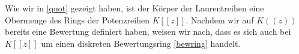 Wie wir in \ref{quot} gezeigt haben, ist der Körper der Laurentreihen eine Obermenge des Rings der Potenzreihen $K[[z]]$. Nachdem wir auf $K((z))$ bereits eine Bewertung definiert haben, weisen wir nach, dass es sich auch bei $K[[z]]$ um einen diskreten Bewertungsring \ref{bewring} handelt. 

